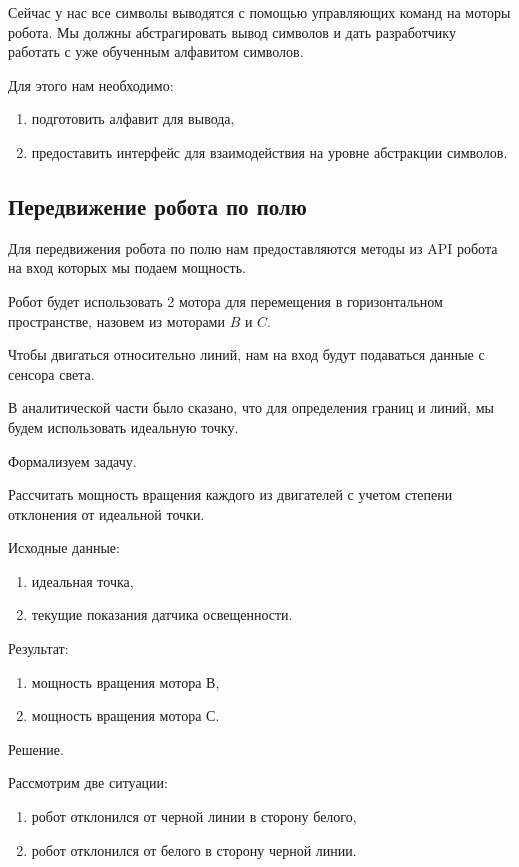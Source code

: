 Сейчас у нас все символы выводятся с помощью управляющих команд на моторы робота. Мы должны абстрагировать вывод символов и дать разработчику работать с уже обученным алфавитом символов.

Для этого нам необходимо:
 \begin{enumerate}
  \item подготовить алфавит для вывода,
  \item предоставить интерфейс для взаимодействия на уровне абстракции символов.
\end{enumerate}

\subsection{Передвижение робота по полю}

Для передвижения робота по полю нам предоставляются методы из API робота на вход которых мы подаем мощность.

Робот будет использовать 2 мотора для перемещения в горизонтальном пространстве, назовем из моторами $B$ и $C$.

Чтобы двигаться относительно линий, нам на вход будут подаваться данные с сенсора света.

В аналитической части было сказано, что для определения границ и линий, мы будем использовать идеальную точку.

Формализуем задачу.

Рассчитать мощность вращения каждого из двигателей с учетом степени отклонения от идеальной точки.

Исходные данные:
 \begin{enumerate}
  \item идеальная точка,
  \item текущие показания датчика освещенности.
\end{enumerate}


Результат:
 \begin{enumerate}
  \item мощность вращения мотора В,
  \item мощность вращения мотора С.
\end{enumerate}


Решение.

Рассмотрим две ситуации:

 \begin{enumerate}
  \item робот отклонился от черной линии в сторону белого,
  \item робот отклонился от белого в сторону черной линии.
\end{enumerate}


